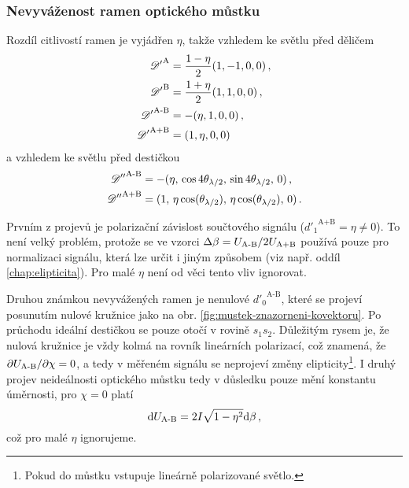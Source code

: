 \subsubsection*{Nevyváženost ramen optického můstku}
Rozdíl citlivostí ramen je vyjádřen $\eta$, takže vzhledem ke světlu před děličem
\begin{subequations}
\begin{align}
    {\mathscr{D}'}^\textrm{A}&=\frac{1-\eta}{2}(1, -1, 0, 0) \,,\\
    {\mathscr{D}'}^\textrm{B}&=\frac{1+\eta}{2}(1, 1, 0, 0) \,,\\
    {\mathscr{D}'}^\textrm{A-B}&=-(\eta, 1, 0, 0) \,,\\
    {\mathscr{D}'}^\textrm{A+B}&=(1, \eta, 0, 0) 
\end{align}
\end{subequations}
a vzhledem ke světlu před destičkou
\begin{subequations}
\begin{align}
    {\mathscr{D}''}^\textrm{A-B} &=-(\eta,\, \cos4\theta_{\lambda/2},\, \sin4\theta_{\lambda/2},\, 0) \,,\\
    {\mathscr{D}''}^\textrm{A+B} &=(1,\, \eta\cos(\theta_{\lambda/2}),\, \eta\cos(\theta_{\lambda/2}),\, 0) \,.
\end{align}
\end{subequations}

Prvním z projevů je polarizační závislost součtového signálu (${d'_1}^\textrm{A+B}=\eta\neq0$).
To není velký problém, protože se ve vzorci $\Delta\beta=U_\textrm{A-B}/2U_\textrm{A+B}$ používá pouze pro normalizaci signálu, která lze určit i jiným způsobem (viz např. oddíl \ref{chap:elipticita}). 
Pro malé $\eta$ není od věci tento vliv ignorovat.

Druhou známkou nevyvážených ramen je nenulové  ${d'_0}^\textrm{A-B}$, které se projeví posunutím nulové kružnice jako na obr. \ref{fig:mustek-znazorneni-kovektoru}. 
Po průchodu ideální destičkou se pouze otočí v rovině $s_1s_2$.
Důležitým rysem je, že nulová kružnice je vždy kolmá na rovník lineárních polarizací, což znamená, že $\partial U_\textrm{A-B}/\partial\chi = 0$, a tedy v měřeném signálu se neprojeví změny elipticity\footnote{Pokud do můstku vstupuje lineárně polarizované světlo.}.
I druhý projev neideálnosti optického můstku tedy v důsledku pouze mění konstantu úměrnosti, pro $\chi=0$ platí
\begin{equation}
    \textrm{d}U_\textrm{A-B} = 2I \sqrt{1-\eta^2} \textrm{d}\beta \,,
\end{equation}
což pro malé $\eta$ ignorujeme.

